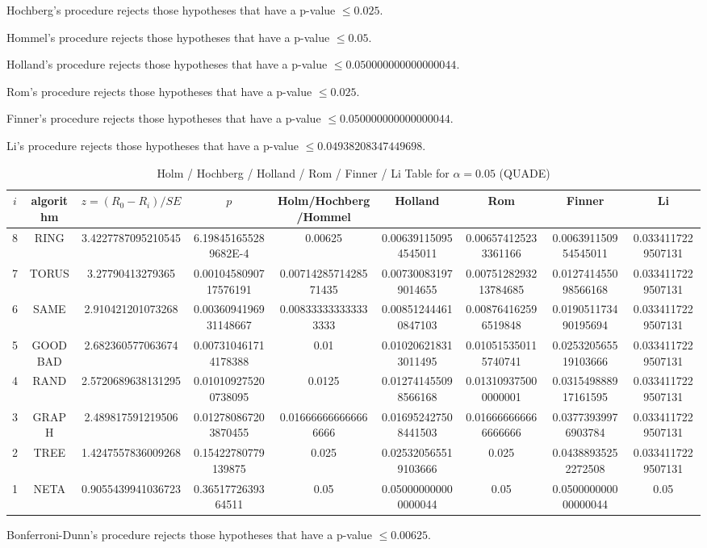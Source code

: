 \documentclass[a4paper,10pt]{article}
\begin{document}
\begin{landscape}
Hochberg's procedure rejects those hypotheses that have a p-value $\le0.025$.


Hommel's procedure rejects those hypotheses that have a p-value $\le0.05$.


Holland's procedure rejects those hypotheses that have a p-value $\le0.050000000000000044$.


Rom's procedure rejects those hypotheses that have a p-value $\le0.025$.


Finner's procedure rejects those hypotheses that have a p-value $\le0.050000000000000044$.


Li's procedure rejects those hypotheses that have a p-value $\le0.04938208347449698$.



\newpage

\begin{table}[!htp]
\centering\scriptsize
\caption{Holm / Hochberg / Holland / Rom / Finner / Li Table for $\alpha=0.05$ (QUADE)}
\begin{tabular}{ccccccccc}
$i$&algorithm&$z=(R_0 - R_i)/SE$&$p$&Holm/Hochberg/Hommel&Holland&Rom&Finner&Li\\
\hline
8& RING&3.4227787095210545&6.198451655289682E-4&0.00625&0.006391150954545011&0.006574125233361166&0.006391150954545011&0.0334117229507131\\
7& TORUS&3.27790413279365&0.0010458090717576191&0.0071428571428571435&0.007300831979014655&0.0075128293213784685&0.012741455098566168&0.0334117229507131\\
6& SAME&2.910421201073268&0.0036094196931148667&0.008333333333333333&0.008512444610847103&0.008764162596519848&0.019051173490195694&0.0334117229507131\\
5& GOODBAD&2.682360577063674&0.007310461714178388&0.01&0.010206218313011495&0.010515350115740741&0.025320565519103666&0.0334117229507131\\
4& RAND&2.5720689638131295&0.010109275200738095&0.0125&0.012741455098566168&0.013109375000000001&0.031549888917161595&0.0334117229507131\\
3& GRAPH&2.489817591219506&0.012780867203870455&0.016666666666666666&0.016952427508441503&0.016666666666666666&0.03773939976903784&0.0334117229507131\\
2& TREE&1.4247557836009268&0.15422780779139875&0.025&0.025320565519103666&0.025&0.04388935252272508&0.0334117229507131\\
1& NETA&0.9055439941036723&0.3651772639364511&0.05&0.050000000000000044&0.05&0.050000000000000044&0.05\\
\hline
\end{tabular}
\end{table}
Bonferroni-Dunn's procedure rejects those hypotheses that have a p-value $\le0.00625$.



\end{landscape}
\end{document}
